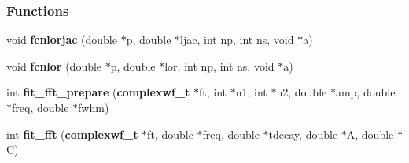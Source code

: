 \subsubsection*{Functions}
\begin{CompactItemize}
\item 
void \textbf{fcnlorjac} (double $\ast$p, double $\ast$ljac, int np, int ns, void $\ast$a)\label{fit__fft_8c_33759794c7068e6243cddaae6792bf40}

\item 
void \textbf{fcnlor} (double $\ast$p, double $\ast$lor, int np, int ns, void $\ast$a)\label{fit__fft_8c_6795d8ac91b98c65ca86e11f3ef9a178}

\item 
int {\bf fit\_\-fft\_\-prepare} ({\bf complexwf\_\-t} $\ast$ft, int $\ast$n1, int $\ast$n2, double $\ast$amp, double $\ast$freq, double $\ast$fwhm)
\item 
int {\bf fit\_\-fft} ({\bf complexwf\_\-t} $\ast$ft, double $\ast$freq, double $\ast$tdecay, double $\ast$A, double $\ast$C)
\end{CompactItemize}
